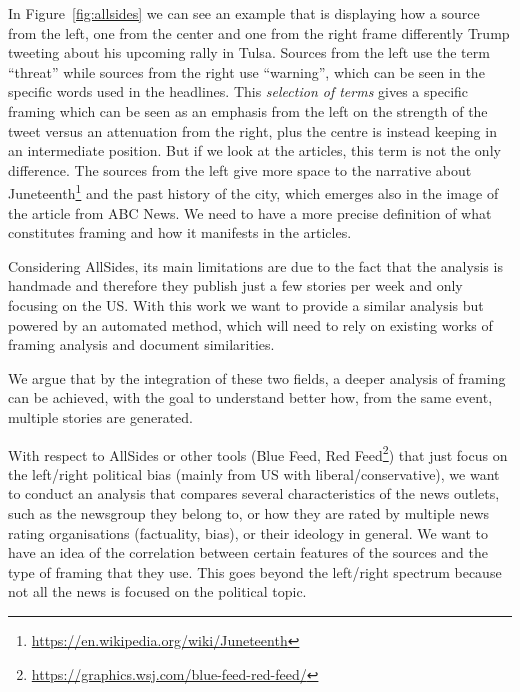 In Figure~\ref{fig:allsides} we can see an example that is displaying how a source from the left, one from the center and one from the right frame differently Trump tweeting about his upcoming rally in Tulsa.
Sources from the left use the term ``threat'' while sources from the right use ``warning'', which can be seen in the specific words used in the headlines.
This \emph{selection of terms} gives a specific framing which can be seen as an emphasis from the left on the strength of the tweet versus an attenuation from the right, plus the centre is instead keeping in an intermediate position.
But if we look at the articles, this term is not the only difference. The sources from the left give more space to the narrative about Juneteenth\footnote{\url{https://en.wikipedia.org/wiki/Juneteenth}} and the past history of the city, which emerges also in the image of the article from ABC News.
We need to have a more precise definition of what constitutes framing and how it manifests in the articles.


Considering AllSides, its main limitations are due to the fact that the analysis is handmade and therefore they publish just a few stories per week and only focusing on the US.
With this work we want to provide a similar analysis but powered by an automated method, which will need to rely on existing works of framing analysis and document similarities.




We argue that by the integration of these two fields, a deeper analysis of framing can be achieved, with the goal to understand better how, from the same event, multiple stories are generated.


With respect to AllSides or other tools (Blue Feed, Red Feed\footnote{\url{https://graphics.wsj.com/blue-feed-red-feed/}}) that just focus on the left/right political bias (mainly from US with liberal/conservative), we want to conduct an analysis that compares several characteristics of the news outlets, such as the newsgroup they belong to, or how they are rated by multiple news rating organisations (factuality, bias), or their ideology in general.
We want to have an idea of the correlation between certain features of the sources and the type of framing that they use. This goes beyond the left/right spectrum because not all the news is focused on the political topic.


